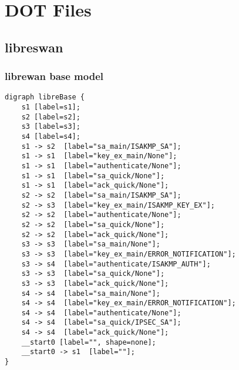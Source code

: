 %
%
% 
% 
% 

\chapter{DOT Files}

\label{app::dot}

\section*{libreswan}
\subsection*{librewan base model}

\begin{lstlisting}[numbers=none]
digraph libreBase {
	s1 [label=s1];
	s2 [label=s2];
	s3 [label=s3];
	s4 [label=s4];
	s1 -> s2  [label="sa_main/ISAKMP_SA"];
	s1 -> s1  [label="key_ex_main/None"];
	s1 -> s1  [label="authenticate/None"];
	s1 -> s1  [label="sa_quick/None"];
	s1 -> s1  [label="ack_quick/None"];
	s2 -> s2  [label="sa_main/ISAKMP_SA"];
	s2 -> s3  [label="key_ex_main/ISAKMP_KEY_EX"];
	s2 -> s2  [label="authenticate/None"];
	s2 -> s2  [label="sa_quick/None"];
	s2 -> s2  [label="ack_quick/None"];
	s3 -> s3  [label="sa_main/None"];
	s3 -> s3  [label="key_ex_main/ERROR_NOTIFICATION"];
	s3 -> s4  [label="authenticate/ISAKMP_AUTH"];
	s3 -> s3  [label="sa_quick/None"];
	s3 -> s3  [label="ack_quick/None"];
	s4 -> s4  [label="sa_main/None"];
	s4 -> s4  [label="key_ex_main/ERROR_NOTIFICATION"];
	s4 -> s4  [label="authenticate/None"];
	s4 -> s4  [label="sa_quick/IPSEC_SA"];
	s4 -> s4  [label="ack_quick/None"];
	__start0 [label="", shape=none];
	__start0 -> s1  [label=""];
}
\end{lstlisting}
\newpage

